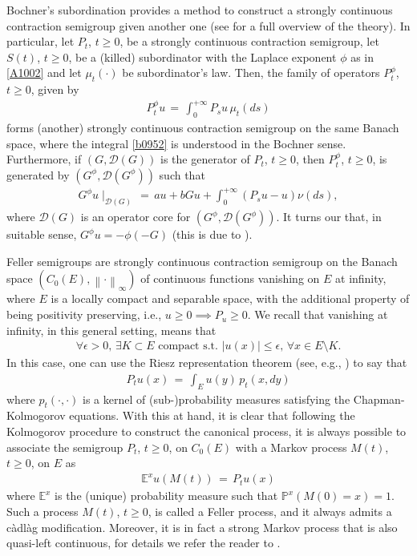 \documentclass[reqno]{amsart}
\theoremstyle{remark}
\numberwithin{equation}{section} %
\newcommand{\1}{\mathds{1}}
\begin{document}
	Bochner's subordination provides a method to construct a strongly continuous contraction semigroup given another one (see \cite[Chapter 15]{bernstein} for a full overview of the theory). In particular, let $P_t$, $t \geq 0$, be a strongly continuous contraction semigroup, let $S(t)$, $t \geq 0$, be a (killed) subordinator with the Laplace exponent $\phi$ as in \eqref{A1002} and let $\mu_t(\cdot)$ be subordinator's law. Then, the family of operators $P_t^\phi$, $t \geq 0$, given by
	\begin{align}
		P_t^\phi u \, = \, \int_0^{+\infty} P_su \, \mu_t(ds)
		\label{b0952}
	\end{align}
	forms (another) strongly continuous contraction semigroup on the same Banach space, where the integral \eqref{b0952} is understood in the Bochner sense. Furthermore, if $(G, \mathcal{D}(G))$ is the generator of $P_t$, $t \geq 0$, then $P_t^\phi$, $t \geq 0$, is generated by $(G^\phi, \mathcal{D}(G^\phi))$ such that
	\begin{align}
		G^\phi u \mid_{\mathcal{D}(G)} \, = \, au + bG u + \int_0^{+\infty} \left( P_s u - u \right) \nu (ds),
	\end{align}
	where $\mathcal{D}(G)$ is an operator core for $(G^\phi, \mathcal{D}(G^\phi))$. It turns our that, in suitable sense, $G^\phi u = - \phi (-G)$ (this is due to \cite{Schilling1998SubordinationBochner}).
	
	Feller semigroups are strongly continuous contraction semigroup on the Banach space $(C_0(E), \left\| \cdot \right\|_\infty)$ of continuous functions vanishing on $E$ at infinity, where $E$ is a locally compact and separable space, with the additional property of being positivity preserving, i.e., $u \geq 0 \implies P_u \geq 0$. We recall that vanishing at infinity, in this general setting, means that
	\begin{align}
		\forall \epsilon >0, \, \exists K \subset E \text{ compact s.t. } |u(x)| \leq \epsilon, \, \forall x \in E\setminus K.
	\end{align}
	In this case, one can use the Riesz representation theorem (see, e.g., \cite[Theorem 1.5]{schillinglevy}) to say that
	\begin{align}
		P_tu (x) \, = \, \int_E u(y) \, p_t(x, dy)
	\end{align}
	where $p_t (\cdot, \cdot)$ is a kernel of (sub-)probability measures satisfying the Chapman-Kolmogorov equations. With this at hand, it is clear that following the Kolmogorov procedure to construct the canonical process, it is always possible to associate the semigroup $P_t$, $t \geq 0$, on $C_0(E)$ with a Markov process $M(t)$, $t \geq0$, on $E$ as
	\begin{align}
		\mathds{E}^x u(M(t)) \, = \, P_tu(x)
	\end{align}
	where $\mathds{E}^x$ is the (unique) probability measure such that $\mathds{P}^x (M(0)=x)=1$. Such a process $M(t)$, $t \geq0$, is called a Feller process, and it always admits a càdlàg modification. Moreover, it is in fact a strong Markov process that is also quasi-left continuous, for details we refer the reader to \cite[Chapter III, Sections 2 and 3]{revuz2013continuous}.
	
\end{document}

